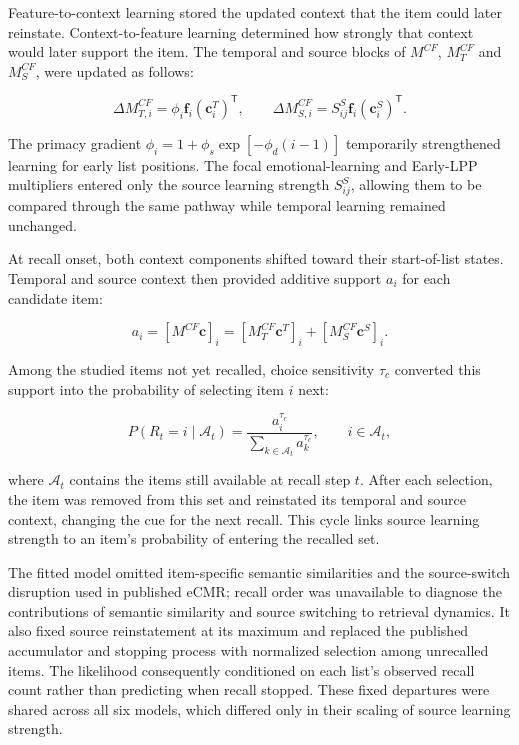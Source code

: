 \documentclass[
  man,
  longtable,
  nolmodern,
  notxfonts,
  notimes,
  draftfirst,
  colorlinks=true,linkcolor=blue,citecolor=blue,urlcolor=blue]{apa7}
\begin{document}
Feature-to-context learning stored the updated context that the item
could later reinstate. Context-to-feature learning determined how
strongly that context would later support the item. The temporal and
source blocks of \(M^{CF}\), \(M_T^{CF}\) and \(M_S^{CF}\), were updated
as follows:

\[
\Delta M_{T,i}^{CF}
=
\phi_i\mathbf f_i(\mathbf c_i^T)^{\mathsf T},
\qquad
\Delta M_{S,i}^{CF}
=
S_{ij}^S\mathbf f_i(\mathbf c_i^S)^{\mathsf T}.
\]

The primacy gradient \(\phi_i=1+\phi_s\exp[-\phi_d(i-1)]\) temporarily
strengthened learning for early list positions. The focal
emotional-learning and Early-LPP multipliers entered only the source
learning strength \(S_{ij}^S\), allowing them to be compared through the
same pathway while temporal learning remained unchanged.

At recall onset, both context components shifted toward their
start-of-list states. Temporal and source context then provided additive
support \(a_i\) for each candidate item:

\[
a_i
=
\left[M^{CF}\mathbf c\right]_i
=
\left[M_T^{CF}\mathbf c^T\right]_i
+
\left[M_S^{CF}\mathbf c^S\right]_i.
\]

Among the studied items not yet recalled, choice sensitivity \(\tau_c\)
converted this support into the probability of selecting item \(i\)
next:

\[
P(R_t=i\mid\mathcal A_t)
=
\frac{a_i^{\tau_c}}{\sum_{k\in\mathcal A_t}a_k^{\tau_c}},
\qquad i\in\mathcal A_t,
\]

where \(\mathcal A_t\) contains the items still available at recall step
\(t\). After each selection, the item was removed from this set and
reinstated its temporal and source context, changing the cue for the
next recall. This cycle links source learning strength to an item's
probability of entering the recalled set.

The fitted model omitted item-specific semantic similarities and the
source-switch disruption used in published eCMR; recall order was
unavailable to diagnose the contributions of semantic similarity and
source switching to retrieval dynamics. It also fixed source
reinstatement at its maximum and replaced the published accumulator and
stopping process with normalized selection among unrecalled items. The
likelihood consequently conditioned on each list's observed recall count
rather than predicting when recall stopped. These fixed departures were
shared across all six models, which differed only in their scaling of
source learning strength.
\end{document}
